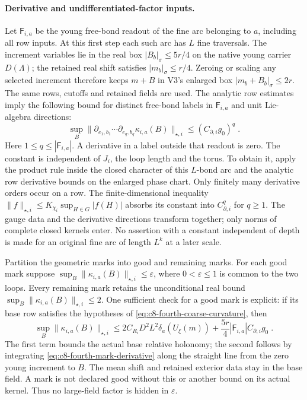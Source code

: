 \documentclass[11pt]{article}
\begin{document}
\paragraph{Derivative and undifferentiated-factor inputs.}
Let $\mathsf F_{i,a}$ be the young free-bond readout of the
fine arc belonging to $a$, including all row inputs.
At this first step each such arc has $L$ fine traversals.
The increment variables lie in the real box
$|B_b|_\sigma\leq5r/4$ on the native young carrier $D(\Lambda)$;
the retained real shift satisfies $|m_b|_\sigma\leq r/4$.
Zeroing or scaling any selected increment therefore keeps
$m+B$ in V3's enlarged box $|m_b+B_b|_\sigma\leq2r$.
The same rows, cutoffs and retained fields are used.
The analytic row estimates imply
the following bound for distinct free-bond labels in
$\mathsf F_{i,a}$ and unit Lie-algebra directions:
\begin{equation}\label{eq:c8-fourth-mark-derivative}
    \sup_B
        \|\partial_{e_1,b_1}\cdots\partial_{e_q,b_q}
            \kappa_{i,a}(B)\|_{\star,i}
        \leq(C_{\partial,i}g_0)^q\;.
\end{equation}
Here $1\leq q\leq|\mathsf F_{i,a}|$. A derivative in a label
outside that readout is zero. The constant is independent
of $J_i$, the loop length and the torus. To obtain it, apply
the product rule inside the closed character of this
$L$-bond arc and the analytic row derivative bounds on
the enlarged phase chart. Only finitely many derivative
orders occur on a row. The finite-dimensional inequality
$\|f\|_{\star,i}\leq K_{\chi_i}\sup_{H\in G}|f(H)|$
absorbs its constant into $C_{\partial,i}^q$ for $q\geq1$.
The gauge data and the derivative directions transform
together; only norms of complete closed kernels enter.
No assertion with a constant independent of depth is made
for an original fine arc of length $L^k$ at a later scale.

Partition the geometric marks into good and remaining marks.
For each good mark suppose
$\sup_B\|\kappa_{i,a}(B)\|_{\star,i}\leq\varepsilon$,
where $0<\varepsilon\leq1$ is common to the two loops.
Every remaining mark retains the unconditional real bound
$\sup_B\|\kappa_{i,a}(B)\|_{\star,i}\leq2$.
One sufficient check for a good mark is explicit:
if its base row satisfies the hypotheses of
\eqref{eq:c8-fourth-coarse-curvature}, then
\begin{equation}\label{eq:c8-fourth-good-mark-check}
    \sup_B\|\kappa_{i,a}(B)\|_{\star,i}
        \leq
        2C_{R_i}D^2L^2\delta_a(U_\xi(m))
        +\frac{5r}{4}|\mathsf F_{i,a}|C_{\partial,i}g_0\;.
\end{equation}
The first term bounds the actual base relative holonomy;
the second follows by integrating
\eqref{eq:c8-fourth-mark-derivative} along the straight
line from the zero young increment to $B$.
The mean shift and retained exterior data stay in the base
field. A mark is not declared good without this or another
bound on its actual kernel. Thus no large-field factor is
hidden in $\varepsilon$.
\end{document}
